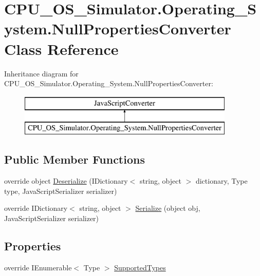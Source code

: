 \hypertarget{class_c_p_u___o_s___simulator_1_1_operating___system_1_1_null_properties_converter}{}\section{C\+P\+U\+\_\+\+O\+S\+\_\+\+Simulator.\+Operating\+\_\+\+System.\+Null\+Properties\+Converter Class Reference}
\label{class_c_p_u___o_s___simulator_1_1_operating___system_1_1_null_properties_converter}
Inheritance diagram for C\+P\+U\+\_\+\+O\+S\+\_\+\+Simulator.\+Operating\+\_\+\+System.\+Null\+Properties\+Converter\+:\begin{figure}[H]
\begin{center}
\leavevmode
\includegraphics[height=2.000000cm]{class_c_p_u___o_s___simulator_1_1_operating___system_1_1_null_properties_converter}
\end{center}
\end{figure}
\subsection*{Public Member Functions}
\begin{DoxyCompactItemize}
\item 
override object \hyperlink{class_c_p_u___o_s___simulator_1_1_operating___system_1_1_null_properties_converter_ac62c0ec906cb5788efcf2a4991a4ee45}{Deserialize} (I\+Dictionary$<$ string, object $>$ dictionary, Type type, Java\+Script\+Serializer serializer)
\item 
override I\+Dictionary$<$ string, object $>$ \hyperlink{class_c_p_u___o_s___simulator_1_1_operating___system_1_1_null_properties_converter_a24f4f81b02516ee4767c4807926c9e0b}{Serialize} (object obj, Java\+Script\+Serializer serializer)
\end{DoxyCompactItemize}
\subsection*{Properties}
\begin{DoxyCompactItemize}
\item 
override I\+Enumerable$<$ Type $>$ \hyperlink{class_c_p_u___o_s___simulator_1_1_operating___system_1_1_null_properties_converter_a463d4cf33b73b9dbe825a51a415656c8}{Supported\+Types}
\end{DoxyCompactItemize}


